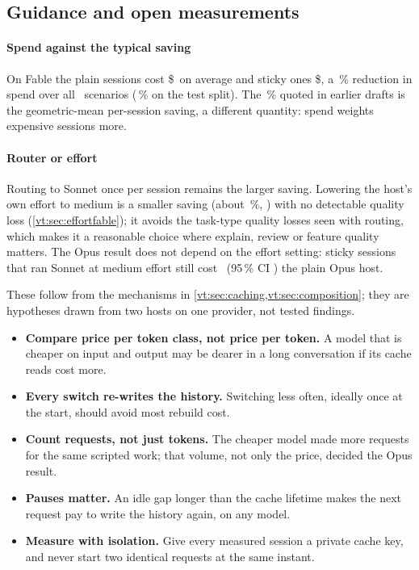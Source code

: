 \subsection{Guidance and open measurements}\label{sec:cguidance}

\paragraph{Spend against the typical saving} On Fable the plain sessions cost \$\RvSpendAnchor\ on average and sticky
ones \$\RvSpendSticky, a \RvSpendCutAll\,\% reduction in spend over all \NScenarios\ scenarios (\RvSpendCutTest\,\% on the
test split). The \CfFableStickySaving\,\% quoted in earlier drafts is the geometric-mean per-session saving, a different
quantity: spend weights expensive sessions more.

\paragraph{Router or effort} Routing to Sonnet once per session remains the larger saving. Lowering the host's own
effort to medium is a smaller saving (about \EfCutPct\,\%, \EfRatio\X) with no detectable quality loss
(\cref{vt:sec:effortfable}); it avoids the task-type quality losses seen with routing, which makes it a reasonable choice
where explain, review or feature quality matters. The Opus result does not depend on the effort setting: sticky sessions
that ran Sonnet at medium effort still cost \RvEffVsAnchorOpusTwo\X\ (95\,\% CI \RvEffVsAnchorOpusCI) the plain Opus host.

\begin{keyidea}[title={Caching guidance (hypotheses)}]
These follow from the mechanisms in \cref{vt:sec:caching,vt:sec:composition}; they are hypotheses drawn from two hosts on
one provider, not tested findings.
\begin{itemize}[leftmargin=1.1em]
  \item \textbf{Compare price per token class, not price per token.} A model that is cheaper on input and output may be
    dearer in a long conversation if its cache reads cost more.
  \item \textbf{Every switch re-writes the history.} Switching less often, ideally once at the start, should avoid most
    rebuild cost.
  \item \textbf{Count requests, not just tokens.} The cheaper model made more requests for the same scripted work; that
    volume, not only the price, decided the Opus result.
  \item \textbf{Pauses matter.} An idle gap longer than the cache lifetime makes the next request pay to write the
    history again, on any model.
  \item \textbf{Measure with isolation.} Give every measured session a private cache key, and never start two identical
    requests at the same instant.
\end{itemize}
\end{keyidea}

